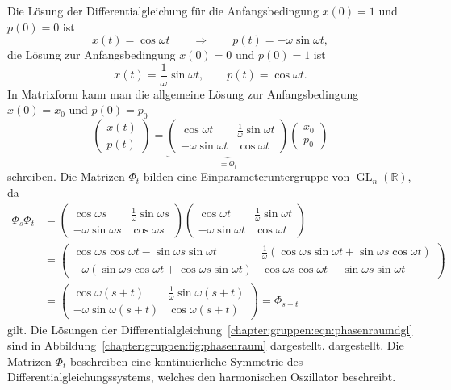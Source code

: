 Die Lösung der Differentialgleichung für die Anfangsbedingung $x(0)=1$ und
$p(0)=0$ ist
\[
x(t)
=
\cos \omega t
\qquad\Rightarrow\qquad
p(t)
=
-\omega \sin\omega t,
\]
die Lösung zur Anfangsbedingung $x(0)=0$ und $p(0)=1$ ist
\[
x(t) = \frac{1}{\omega} \sin\omega t,
\qquad
p(t) = \cos \omega t.
\]
In Matrixform kann man die allgemeine Lösung zur Anfangsbedingung $x(0)=x_0$
und $p(0)=p_0$
\begin{equation}
\begin{pmatrix}
x(t)\\
p(t)
\end{pmatrix}
=
\underbrace{
\begin{pmatrix}
 \cos \omega t & \frac{1}{\omega} \sin\omega t \\
-\omega \sin\omega t & \cos\omega t
\end{pmatrix}
}_{\displaystyle =\Phi_t}
\begin{pmatrix}x_0\\p_0\end{pmatrix}
\label{buch:gruppen:eqn:phi}
\end{equation}
schreiben.
Die Matrizen $\Phi_t$ bilden eine Einparameteruntergruppe von
$\operatorname{GL}_n(\mathbb{R})$, da
\begin{align*}
\Phi_s\Phi_t
&=
\begin{pmatrix}
 \cos\omega s & \frac{1}{\omega} \sin\omega s \\
-\omega \sin\omega s & \cos\omega s
\end{pmatrix}
\begin{pmatrix}
 \cos\omega t & \frac{1}{\omega} \sin\omega t \\
-\omega \sin\omega t & \cos\omega t
\end{pmatrix}
\\
&=
\begin{pmatrix}
\cos\omega s \cos\omega t - \sin\omega s \sin\omega t 
& \frac{1}{\omega} ( \cos\omega s \sin\omega t + \sin\omega s \cos \omega t)
\\
-\omega (\sin\omega s \cos\omega t + \cos\omega s \sin\omega t )
& \cos\omega s \cos\omega t -\sin\omega s \sin\omega t 
\end{pmatrix}
\\
&=
\begin{pmatrix}
 \cos\omega(s+t) & \frac{1}{\omega}\sin\omega(s+t) \\
-\omega \sin\omega(s+t) & \cos\omega(s+t)
\end{pmatrix}
=
\Phi_{s+t}
\end{align*}
gilt.
Die Lösungen der 
Differentialgleichung~\eqref{chapter:gruppen:eqn:phasenraumdgl}
sind in Abbildung~\ref{chapter:gruppen:fig:phasenraum} dargestellt.
dargestellt.
Die Matrizen $\Phi_t$ beschreiben eine kontinuierliche Symmetrie
des Differentialgleichungssystems, welches den harmonischen Oszillator
beschreibt.


